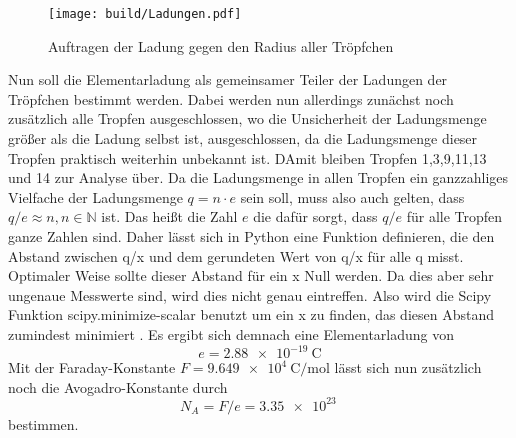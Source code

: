 \begin{figure}[H]
    \centering
    \texttt{[image: build/Ladungen.pdf]}
    \caption{Auftragen der Ladung gegen den Radius aller Tröpfchen}
    \label{fig:Ladung}
  \end{figure}

  \noindent Nun soll die Elementarladung als gemeinsamer Teiler der Ladungen der Tröpfchen bestimmt werden.
  Dabei werden nun allerdings zunächst noch zusätzlich alle Tropfen ausgeschlossen, wo die Unsicherheit der Ladungsmenge 
  größer als die Ladung selbst ist, ausgeschlossen, da die Ladungsmenge dieser Tropfen praktisch weiterhin unbekannt ist.
  DAmit bleiben Tropfen 1,3,9,11,13 und 14 zur Analyse über. Da die Ladungsmenge in allen Tropfen ein ganzzahliges
  Vielfache der Ladungsmenge $q=n\cdot e$ sein soll, muss also auch gelten, dass $q/e\approx n, n \in \mathbb{N}$ ist.
  Das heißt die Zahl $e$ die dafür sorgt, dass $q/e$ für alle Tropfen ganze Zahlen sind. Daher lässt sich in Python eine
  Funktion definieren, die den Abstand zwischen q/x und dem gerundeten Wert von q/x für alle q misst. Optimaler Weise sollte dieser Abstand für ein
  x Null werden. Da dies aber sehr ungenaue Messwerte sind, wird dies nicht genau eintreffen. Also wird die Scipy Funktion scipy.minimize-scalar benutzt um ein x zu finden,
  das diesen Abstand zumindest minimiert \cite{scipy}. Es ergibt sich demnach eine Elementarladung von
  \begin{equation*}
    e=\qty{2.88e-19}{\coulomb}
  \end{equation*}
  Mit der Faraday-Konstante $F=\qty{9.649e4}{\coulomb\per\mol}$ lässt sich nun zusätzlich noch die Avogadro-Konstante
  durch
  \begin{equation*}
    N_A=F/e=\qty{3.35e23}{}
  \end{equation*}
  bestimmen.